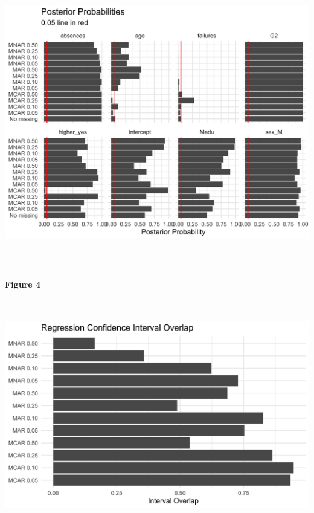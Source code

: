 \documentclass[11pt]{article}
\begin{document}
\includegraphics[width=6.5in, height=5in]{posterior-probabilities-1}

\textbf{Figure 4}

\includegraphics[width=6.5in, height=4in]{credible-interval-overlap-overall-1}

\newpage



\end{document}
